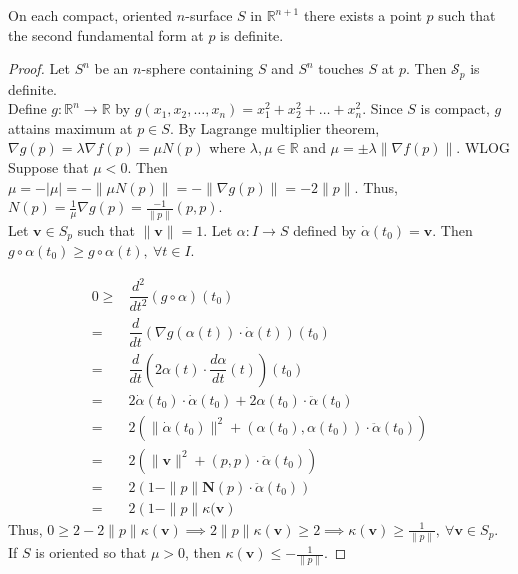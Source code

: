 \begin{theorem}
	On each compact, oriented $n$-surface $S$ in $\mathbb{R}^{n+1}$ there exists a point $p$ such that the second fundamental form at $p$ is definite.
\end{theorem}
\begin{proof}
	Let $S^n$ be an $n$-sphere containing $S$ and $S^n$ touches $S$ at $p$.
	Then $\mathscr{S}_p$ is definite.\\


	Define $g : \mathbb{R}^n \to \mathbb{R}$ by $g(x_1,x_2,\dots, x_n) = x_1^2 + x_2^2 + \dots + x_n^2$.
	Since $S$ is compact, $g$ attains maximum at $p \in S$.
	By Lagrange multiplier theorem, $\nabla g(p) = \lambda \nabla f(p) = \mu N(p)$ where $\lambda,\mu \in \mathbb{R}$ and $\mu = \pm \lambda \|\nabla f(p) \|$.
	WLOG Suppose that $\mu < 0$.
	Then $\mu = -|\mu| = -\|\mu N(p) \| = -\| \nabla g(p) \| = -2\|p\|$.
	Thus, $N(p) = \frac{1}{\mu} \nabla g(p) = \frac{-1}{\| p \|} (p,p)$. \\


	Let $\mathbf{v} \in S_p$ such that $\| \mathbf{v} \| = 1$.
	Let $\alpha : I \to S$ defined by $\dot{\alpha}(t_0) = \mathbf{v}$.
	Then $g \circ \alpha(t_0) \ge g \circ \alpha(t),\ \forall t \in I$.

\begingroup
\allowdisplaybreaks
	\begin{align*}
		0 \ge & \dfrac{d^2}{dt^2} \left( g \circ \alpha \right)(t_0) \\
		= & \dfrac{d}{dt} \left( \nabla g(\alpha(t)) \cdot \dot{\alpha}(t) \right)(t_0) \\
		= & \dfrac{d}{dt} \left( 2\alpha(t) \cdot \dfrac{d\alpha}{dt} (t) \right)(t_0) \\
		= & 2\dot{\alpha}(t_0) \cdot \dot{\alpha}(t_0) + 2 \alpha(t_0) \cdot \ddot{\alpha}(t_0)\\
		= & 2 \left( \| \dot{\alpha}(t_0)\|^2 + (\alpha(t_0),\alpha(t_0)) \cdot \ddot{\alpha}(t_0) \right) \\
		= & 2 \left( \| \mathbf{v} \|^2 + (p,p) \cdot \ddot{\alpha}(t_0) \right)\\
		= & 2\left( 1-\|p\|\mathbf{N}(p) \cdot \ddot{\alpha}(t_0) \right)\\
		= & 2\left( 1-\|p\| \kappa(\mathbf{v} \right)
	\end{align*}
\endgroup
	Thus, $0 \ge 2-2\|p\|\kappa(\mathbf{v}) \implies 2\|p\|\kappa(\mathbf{v}) \ge 2 \implies \kappa(\mathbf{v}) \ge \frac{1}{\|p\|},\ \forall \mathbf{v} \in S_p$.
	If $S$ is oriented so that $\mu > 0$, then $\kappa(\mathbf{v}) \le -\frac{1}{\|p\|}$.
\end{proof}

